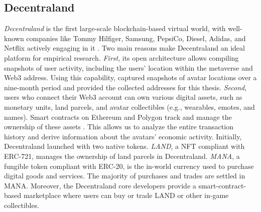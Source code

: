 \documentclass[12pt,a4paper,titlepage,oneside,english]{article}
\begin{document}
\subsection{Decentraland}
\textit{Decentraland} is the first large-scale blockchain-based virtual world, with well-known companies like Tommy Hilfiger, Samsung, PepsiCo, Diesel, Adidas, and Netflix actively engaging in it \citep{metaverse-retailing2023}.\newline
Two main reasons make Decentraland an ideal platform for empirical research.
\textit{First}, its open architecture allows compiling snapshots of user activity, including the users' location within the metaverse and Web3 address. Using this capability, \cite{metaverse-retailing2023} captured snapshots of avatar locations over a nine-month period and provided the collected addresses for this thesis.\newline
\textit{Second}, users who connect their Web3 account can own various digital assets, such as monetary units, land parcels, and avatar collectibles (e.g., wearables, emotes, and names). Smart contracts on Ethereum and Polygon track and manage the ownership of these assets \citep{goldbergschaer2023}. This allows us to analyze the entire transaction history and derive information about the avatars' economic activity. \newline
Initially, Decentraland launched with two native tokens. \textit{LAND}, a NFT compliant with ERC-721, manages the ownership of land parcels in Decentraland. \textit{MANA}, a fungible token compliant with ERC-20, is the in-world currency used to purchase digital goods and services. The majority of purchases and trades are settled in MANA. \newline 
Moreover, the Decentraland core developers provide a smart-contract-based marketplace where users can buy or trade LAND or other in-game collectibles.
\end{document}
